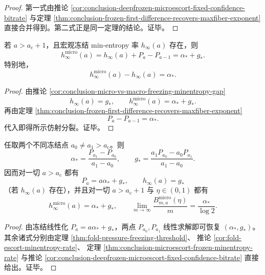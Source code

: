 \begin{proof}
第一式由推论 \ref{cor:conclusion-deepfrozen-microescort-fixed-confidence-bitrate}
与定理 \ref{thm:conclusion-frozen-first-difference-recovers-maxfiber-exponent}
直接合并得到。第二式正是同一定理的结论。证毕。
\end{proof}

\begin{corollary}\label{cor:conclusion-micro-macro-frozen-minentropy-affine-splitting}
若 \(a>a_{\mathrm c}+1\)，且宏观冻结 min-entropy 率 \(h_\infty(a)\) 存在，则
\[
h_\infty^{\mathrm{micro}}(a)
=
h_\infty(a)+P_a-P_{a-1}
=
\alpha_\ast+g_\ast.
\]
特别地，
\[
h_\infty^{\mathrm{micro}}(a)-h_\infty(a)=\alpha_\ast.
\]
\end{corollary}

\begin{proof}
由推论 \ref{cor:conclusion-micro-vs-macro-freezing-minentropy-gap}
\[
h_\infty(a)=g_\ast,
\qquad
h_\infty^{\mathrm{micro}}(a)=\alpha_\ast+g_\ast.
\]
再由定理 \ref{thm:conclusion-frozen-first-difference-recovers-maxfiber-exponent}
\[
P_a-P_{a-1}=\alpha_\ast.
\]
代入即得所示仿射分裂。证毕。
\end{proof}

\begin{corollary}[冻结枝的双标量闭包]\label{cor:conclusion-frozen-branch-two-scalar-closure}
任取两个不同冻结点 \(a_0\neq a_1>a_{\mathrm c}\)。则
\[
\alpha_\ast=\frac{P_{a_1}-P_{a_0}}{a_1-a_0},
\qquad
g_\ast=\frac{a_1P_{a_0}-a_0P_{a_1}}{a_1-a_0}.
\]
因而对一切 \(a>a_{\mathrm c}\) 都有
\[
P_a=a\alpha_\ast+g_\ast,
\qquad
h_\infty(a)=g_\ast
\]
（若 \(h_\infty(a)\) 存在），并且对一切 \(a>a_{\mathrm c}+1\) 与 \(\eta\in(0,1)\) 都有
\[
h_\infty^{\mathrm{micro}}(a)=\alpha_\ast+g_\ast,
\qquad
\lim_{m\to\infty}\frac{B_{m,a}^{\mathrm{micro}}(\eta)}{m}
=
\frac{\alpha_\ast}{\log 2}.
\]
\end{corollary}

\begin{proof}
由冻结线性化 \(P_a=a\alpha_\ast+g_\ast\)，两点 \(P_{a_0},P_{a_1}\) 线性求解即可恢复 \((\alpha_\ast,g_\ast)\)。
其余诸式分别由定理 \ref{thm:fold-pressure-freezing-threshold}、
推论 \ref{cor:fold-escort-minentropy-rate}、
定理 \ref{thm:conclusion-microescort-frozen-minentropy-rate}
与推论 \ref{cor:conclusion-deepfrozen-microescort-fixed-confidence-bitrate}
直接给出。证毕。
\end{proof}

